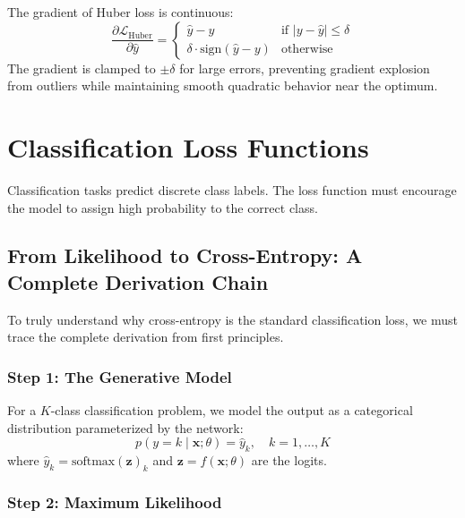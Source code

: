 \begin{example}
The gradient of Huber loss is continuous:
\begin{equation}
\frac{\partial \mathcal{L}_{\text{Huber}}}{\partial \hat{y}} = 
\begin{cases}
\hat{y} - y & \text{if } |y - \hat{y}| \leq \delta \\
\delta \cdot \text{sign}(\hat{y} - y) & \text{otherwise}
\end{cases}
\end{equation}
The gradient is clamped to $\pm \delta$ for large errors, preventing gradient explosion from outliers while maintaining smooth quadratic behavior near the optimum.
\end{example}

\section{Classification Loss Functions}

Classification tasks predict discrete class labels. The loss function must encourage the model to assign high probability to the correct class.

\subsection{From Likelihood to Cross-Entropy: A Complete Derivation Chain}

To truly understand why cross-entropy is the standard classification loss, we must trace the complete derivation from first principles.

\subsubsection{Step 1: The Generative Model}

For a $K$-class classification problem, we model the output as a categorical distribution parameterized by the network:
\begin{equation}
p(y = k \mid \mathbf{x}; \theta) = \hat{y}_k, \quad k = 1, \ldots, K
\end{equation}
where $\hat{y}_k = \text{softmax}(\mathbf{z})_k$ and $\mathbf{z} = f(\mathbf{x}; \theta)$ are the logits.

\subsubsection{Step 2: Maximum Likelihood}

